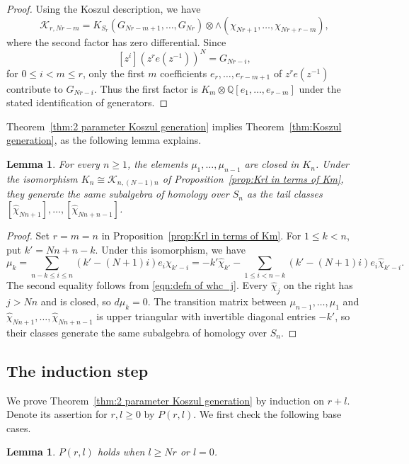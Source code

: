 \documentclass[reqno]{amsart}
\newtheorem{lem}[thm]{Lemma}
\theoremstyle{definition}
\theoremstyle{remark}
\newcommand{\QQ}{\mathbb{Q}}
\newcommand{\cak}{\mathcal{K}}
\newcommand{\whc}{\widehat{\chi}}
\begin{document}
\begin{proof}
Using the Koszul description, we have
\[\cak_{r,Nr-m}=K_{S_r}(G_{Nr-m+1},\dots,G_{Nr})\otimes\wedge(\chi_{Nr+1},\dots,\chi_{Nr+r-m}),\]
where the second factor has zero differential. Since
\[[z^i](z^re(z^{-1}))^N=G_{Nr-i},\]
for $0\le i<m\le r$, only the first $m$ coefficients $e_r,\dots,e_{r-m+1}$ of $z^re(z^{-1})$ contribute to $G_{Nr-i}$. Thus the first factor is $K_m\otimes\QQ[e_1,\dots,e_{r-m}]$ under the stated identification of generators.
\end{proof}

Theorem~\ref{thm:2 parameter Koszul generation} implies Theorem~\ref{thm:Koszul generation}, as the following lemma explains.

\begin{lem}\label{lem:mu_k closed and tail generators}
For every $n\ge1$, the elements $\mu_1,\dots,\mu_{n-1}$ are closed in $K_n$. Under the isomorphism $K_n\cong\cak_{n,(N-1)n}$ of Proposition~\ref{prop:Krl in terms of Km}, they generate the same subalgebra of homology over $S_n$ as the tail classes $[\whc_{Nn+1}],\dots,[\whc_{Nn+n-1}]$.
\end{lem}

\begin{proof}
Set $r=m=n$ in Proposition~\ref{prop:Krl in terms of Km}. For $1\le k<n$, put $k'=Nn+n-k$. Under this isomorphism, we have
\[\mu_k=\sum_{n-k\le i\le n}(k'-(N+1)i)e_i\chi_{k'-i} =-k'\whc_{k'}-\sum_{1\le i<n-k}(k'-(N+1)i)e_i\whc_{k'-i}.\]
The second equality follows from \eqref{eqn:defn of whc_j}. Every $\whc_j$ on the right has $j>Nn$ and is closed, so $d\mu_k=0$. The transition matrix between $\mu_{n-1},\dots,\mu_1$ and $\whc_{Nn+1},\dots,\whc_{Nn+n-1}$ is upper triangular with invertible diagonal entries $-k'$, so their classes generate the same subalgebra of homology over $S_n$.
\end{proof}

\subsection{The induction step}

We prove Theorem~\ref{thm:2 parameter Koszul generation} by induction on $r+l$. Denote its assertion for $r,l\ge0$ by $P(r,l)$. We first check the following base cases.

\begin{lem}\label{lem:base cases of induction}
$P(r,l)$ holds when $l\ge Nr$ or $l=0$.
\end{lem}
\end{document}
